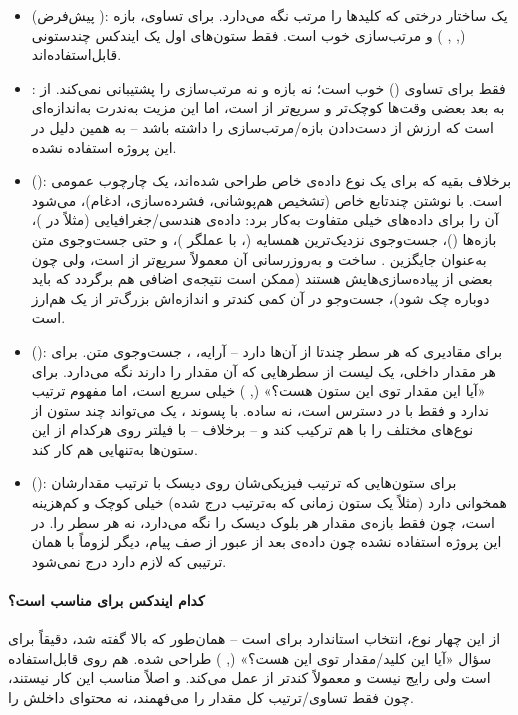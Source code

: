 \begin{itemize}
\item \textbf{} (پیش‌فرض ): یک ساختار درختی که کلیدها را مرتب نگه می‌دارد. برای تساوی، بازه (\lr{<}, \lr{>}, ) و مرتب‌سازی خوب است. فقط ستون‌های اول یک ایندکس چندستونی قابل‌استفاده‌اند.
\item \textbf{}: فقط برای تساوی (\lr{=}) خوب است؛ نه بازه و نه مرتب‌سازی را پشتیبانی نمی‌کند. از  به بعد بعضی وقت‌ها کوچک‌تر و سریع‌تر از  است، اما این مزیت به‌ندرت به‌اندازه‌ای است که ارزش از دست‌دادن بازه/مرتب‌سازی را داشته باشد -- به همین دلیل در این پروژه استفاده نشده.
\item \textbf{} (): برخلاف بقیه که برای یک نوع داده‌ی خاص طراحی شده‌اند،  یک چارچوب عمومی است. با نوشتن چندتابع خاص (تشخیص هم‌پوشانی، فشرده‌سازی، ادغام)، می‌شود آن را برای داده‌های خیلی متفاوت به‌کار برد: داده‌ی هندسی/جغرافیایی (مثلاً در )، بازه‌ها ()، جست‌وجوی نزدیک‌ترین همسایه (، با عملگر \lr{<->})، و حتی جست‌وجوی متن به‌عنوان جایگزین . ساخت و به‌روزرسانی آن معمولاً سریع‌تر از  است، ولی چون بعضی از پیاده‌سازی‌هایش  هستند (ممکن است نتیجه‌ی اضافی هم برگردد که باید دوباره چک شود)، جست‌وجو در آن کمی کندتر و اندازه‌اش بزرگ‌تر از یک  هم‌ارز است.
\item \textbf{} (): برای مقادیری که هر سطر چندتا از آن‌ها دارد -- آرایه، ، جست‌وجوی متن. برای هر مقدار داخلی، یک لیست از سطرهایی که آن مقدار را دارند نگه می‌دارد. برای «آیا این مقدار توی این ستون هست؟» (, \lr{\&\&}) خیلی سریع است، اما مفهوم ترتیب ندارد و فقط با  در دسترس است، نه  ساده. با پسوند ، یک  می‌تواند چند ستون از نوع‌های مختلف را با هم ترکیب کند و -- برخلاف  -- با فیلتر روی هرکدام از این ستون‌ها به‌تنهایی هم کار کند.
\item \textbf{} (): برای ستون‌هایی که ترتیب فیزیکی‌شان روی دیسک با ترتیب مقدارشان همخوانی دارد (مثلاً یک ستون زمانی که به‌ترتیب درج شده) خیلی کوچک و کم‌هزینه است، چون فقط بازه‌ی مقدار هر بلوک دیسک را نگه می‌دارد، نه هر سطر را. در این پروژه استفاده نشده چون داده‌ی  بعد از عبور از صف پیام، دیگر لزوماً با همان ترتیبی که  لازم دارد درج نمی‌شود.
\end{itemize}

\paragraph{کدام ایندکس برای  مناسب است؟} از این چهار نوع،  انتخاب استاندارد  برای  است -- همان‌طور که بالا گفته شد، دقیقاً برای سؤال «آیا این کلید/مقدار توی این  هست؟» (, ) طراحی شده.  هم روی  قابل‌استفاده است ولی رایج نیست و معمولاً کندتر از  عمل می‌کند.  و  اصلاً مناسب این کار نیستند، چون فقط تساوی/ترتیب کل مقدار  را می‌فهمند، نه محتوای داخلش را.

